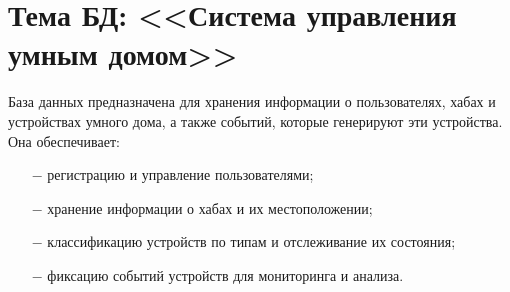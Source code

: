 \documentclass[oneside,a4paper,14pt]{extarticle}
\begin{document}
\section*{Тема БД: <<Система управления умным домом>>}
База данных предназначена для хранения информации о пользователях, хабах и устройствах умного дома, а также событий, которые генерируют эти устройства. Она обеспечивает:
\begin{itemize}
  \item[$-$] регистрацию и управление пользователями;
  \item[$-$] хранение информации о хабах и их местоположении;
  \item[$-$] классификацию устройств по типам и отслеживание их состояния;
  \item[$-$] фиксацию событий устройств для мониторинга и анализа.
\end{itemize}
\end{document}
